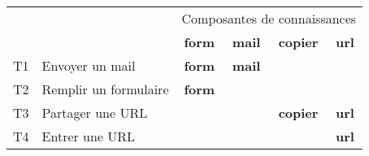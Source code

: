 \documentclass{standalone}
\begin{document}
\begin{tabular}{rlcccc} \toprule
& & \multicolumn{4}{c}{Composantes de connaissances}\\
& & \textbf{form} & \textbf{mail} & \textbf{copier} & \textbf{url}\\ \midrule
T1 & Envoyer un mail & \textbf{form} & \textbf{mail}\\
T2 & Remplir un formulaire & \textbf{form}\\
T3 & Partager une URL & & & \textbf{copier} & \textbf{url}\\
T4 & Entrer une URL & & & & \textbf{url}\\ \bottomrule
\end{tabular}
\end{document}
